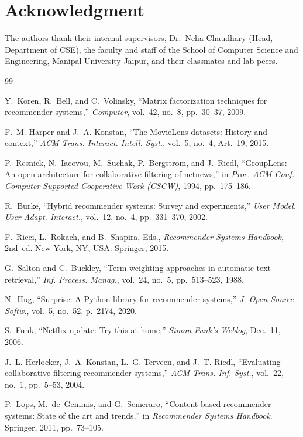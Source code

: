 \documentclass[conference]{IEEEtran}
\begin{document}
  \section*{Acknowledgment}
  The authors thank their internal supervisors, Dr.\ Neha Chaudhary (Head, Department of CSE), the faculty and staff of the School of Computer Science and Engineering, Manipal University Jaipur, and their classmates and lab peers.

  \begin{thebibliography}{99}

  Y.~Koren, R.~Bell, and C.~Volinsky, ``Matrix factorization techniques for recommender systems,'' \emph{Computer}, vol.~42, no.~8, pp.~30--37, 2009.

  F.~M. Harper and J.~A. Konstan, ``The MovieLens datasets: History and context,'' \emph{ACM Trans. Interact. Intell. Syst.}, vol.~5, no.~4, Art.~19, 2015.

  P.~Resnick, N.~Iacovou, M.~Suchak, P.~Bergstrom, and J.~Riedl, ``GroupLens: An open architecture for collaborative filtering of netnews,'' in \emph{Proc. ACM Conf. Computer Supported Cooperative Work (CSCW)}, 1994, pp.~175--186.

  R.~Burke, ``Hybrid recommender systems: Survey and experiments,'' \emph{User Model. User-Adapt. Interact.}, vol.~12, no.~4, pp.~331--370, 2002.

  F.~Ricci, L.~Rokach, and B.~Shapira, Eds., \emph{Recommender Systems Handbook}, 2nd~ed. New York, NY, USA: Springer, 2015.

  G.~Salton and C.~Buckley, ``Term-weighting approaches in automatic text retrieval,'' \emph{Inf. Process. Manag.}, vol.~24, no.~5, pp.~513--523, 1988.

  N.~Hug, ``Surprise: A Python library for recommender systems,'' \emph{J. Open Source Softw.}, vol.~5, no.~52, p.~2174, 2020.

  S.~Funk, ``Netflix update: Try this at home,'' \emph{Simon Funk's Weblog}, Dec.~11, 2006.

  J.~L. Herlocker, J.~A. Konstan, L.~G. Terveen, and J.~T. Riedl, ``Evaluating collaborative filtering recommender systems,'' \emph{ACM Trans. Inf. Syst.}, vol.~22, no.~1, pp.~5--53, 2004.

  P.~Lops, M.~de~Gemmis, and G.~Semeraro, ``Content-based recommender systems: State of the art and trends,'' in \emph{Recommender Systems Handbook}. Springer, 2011, pp.~73--105.


\end{thebibliography}
\end{document}
